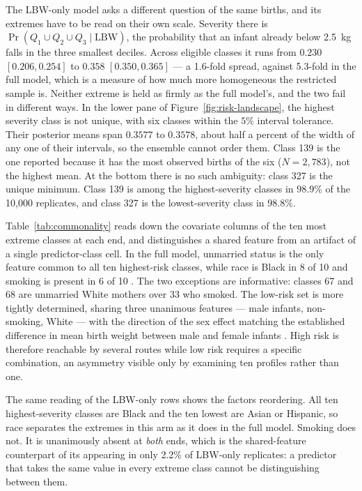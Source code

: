 \documentclass[AMA]{USG}
\begin{document}
The LBW-only model asks a different question of the same births, and its extremes have to be read on their own scale. Severity there is $\Pr(Q_1 \cup Q_2 \cup Q_3 \mid \mathrm{LBW})$, the probability that an infant already below 2.5~kg falls in the three smallest deciles. Across eligible classes it runs from $0.230$ $[0.206, 0.254]$ to $0.358$ $[0.350, 0.365]$ --- a 1.6-fold spread, against 5.3-fold in the full model, which is a measure of how much more homogeneous the restricted sample is.
Neither extreme is held as firmly as the full model's, and the two fail in different ways. In the lower pane of Figure~\ref{fig:risk-landscape}, the highest severity class is not unique, with six classes within the $5\%$ interval tolerance. Their posterior means span $0.3577$ to $0.3578$, about half a percent of the width of any one of their intervals, so the ensemble cannot order them. Class 139 is the one reported because it has the most observed births of the six ($N=2{,}783$), not the highest mean. At the bottom there is no such ambiguity: class 327 is the unique minimum. Class 139 is among the highest-severity classes in $98.9\%$ of the 10{,}000 replicates, and class 327 is the lowest-severity class in $98.8\%$.

Table~\ref{tab:commonality} reads down the covariate columns of the ten most extreme classes at each end, and distinguishes a shared feature from an artifact of a single predictor-class cell. In the full model, unmarried status is the only feature common to all ten highest-risk classes, while race is Black in 8 of 10 and smoking is present in 6 of 10 \cite{smoking_lbw}. The two exceptions are informative: classes 67 and 68 are unmarried White mothers over 33 who smoked. The low-risk set is more tightly determined, sharing three unanimous features --- male infants, non-smoking, White --- with the direction of the sex effect matching the established difference in mean birth weight between male and female infants \cite{vanvliet2009decreasing}. High risk is therefore reachable by several routes while low risk requires a specific combination, an asymmetry visible only by examining ten profiles rather than one.

The same reading of the LBW-only rows shows the factors reordering. All ten highest-severity classes are Black and the ten lowest are Asian or Hispanic, so race separates the extremes in this arm as it does in the full model. Smoking does not. It is unanimously absent at \emph{both} ends, which is the shared-feature counterpart of its appearing in only 2.2\% of LBW-only replicates: a predictor that takes the same value in every extreme class cannot be distinguishing between them.
\end{document}
